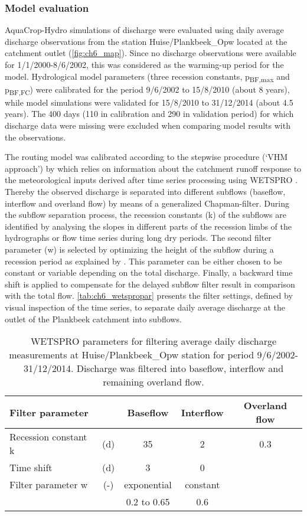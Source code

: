 \subsubsection{Model evaluation}
AquaCrop-Hydro simulations of discharge were evaluated using daily average discharge observations from the station Huise/Plankbeek\_Opw \parencite{vmm2015} located at the catchment outlet (\autoref{fig:ch6_map}). Since no discharge observations were available for 1/1/2000-8/6/2002, this was considered as the warming-up period for the model. Hydrological model parameters (three recession constants, p\textsubscript{BF,max} and p\textsubscript{BF,FC}) were calibrated for the period 9/6/2002 to 15/8/2010 (about 8 years), while model simulations were validated for 15/8/2010 to 31/12/2014 (about 4.5 years). The 400 days (110 in calibration and 290 in validation period) for which discharge data were missing were excluded when comparing model results with the observations. 

The routing model was calibrated according to the stepwise procedure (`VHM approach') by \textcite{willems2014a} which relies on information about the catchment runoff response to the meteorological inputs derived after time series processing using WETSPRO \parencite{willems2009}. Thereby the observed discharge is separated into different subflows (baseflow, interflow and overland flow) by means of a generalized Chapman-filter. During the subflow separation process, the recession constants (k) of the subflows are identified by analysing the slopes in different parts of the recession limbs of the hydrographs or flow time series during long dry periods. The second filter parameter (w) is selected by optimizing the height of the subflow during a recession period as explained by \textcite{willems2009}. This parameter can be either chosen to be constant or variable depending on the total discharge. Finally, a backward time shift is applied to compensate for the delayed subflow filter result in comparison with the total flow. \autoref{tab:ch6_wetspropar} presents the filter settings, defined by visual inspection of the time series, to separate daily average discharge at the outlet of the Plankbeek catchment into subflows. 

\begin{table}[htbp]
  	\caption{WETSPRO parameters for filtering average daily discharge measurements at Huise/Plankbeek\_Opw station for period 9/6/2002-31/12/2014. Discharge was filtered into baseflow, interflow and remaining overland flow.}
 \begin{tabular}{lcccc}
\toprule
\textbf{Filter parameter} & & \textbf{Baseflow} & \textbf{Interflow} & \textbf{Overland flow} \\
\midrule
Recession constant k &(\si{d}) & 35    & 2     & 0.3 \\
Time shift &(\si{d}) & 3     & 0     &  \\
Filter parameter w &(-) & exponential & constant &  \\
    &  & 0.2 to 0.65 & 0.6   &  \\
\bottomrule
\end{tabular}%
  \label{tab:ch6_wetspropar}%
  \end{table}

